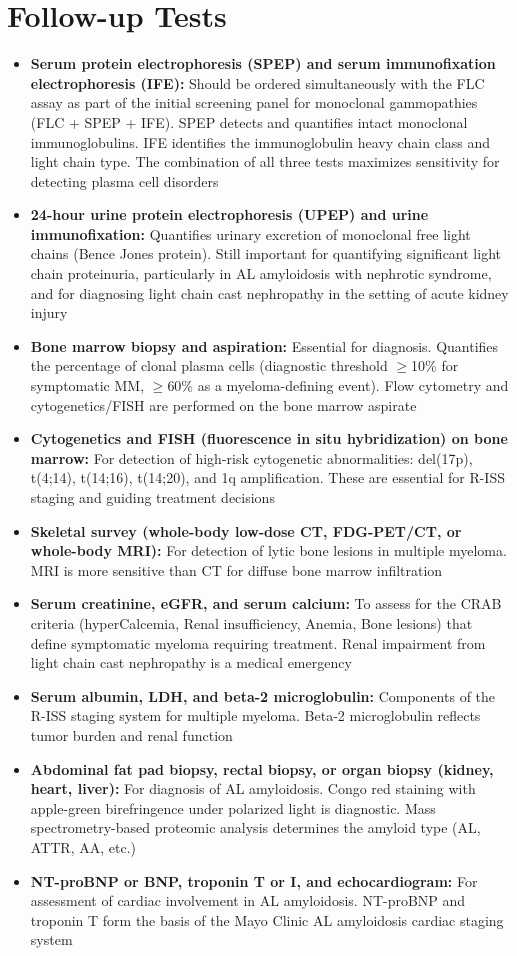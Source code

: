 \section*{Follow-up Tests}
\begin{itemize}
  \item \textbf{Serum protein electrophoresis (SPEP) and serum immunofixation electrophoresis (IFE):} Should be ordered simultaneously with the FLC assay as part of the initial screening panel for monoclonal gammopathies (FLC + SPEP + IFE). SPEP detects and quantifies intact monoclonal immunoglobulins. IFE identifies the immunoglobulin heavy chain class and light chain type. The combination of all three tests maximizes sensitivity for detecting plasma cell disorders
  \item \textbf{24-hour urine protein electrophoresis (UPEP) and urine immunofixation:} Quantifies urinary excretion of monoclonal free light chains (Bence Jones protein). Still important for quantifying significant light chain proteinuria, particularly in AL amyloidosis with nephrotic syndrome, and for diagnosing light chain cast nephropathy in the setting of acute kidney injury
  \item \textbf{Bone marrow biopsy and aspiration:} Essential for diagnosis. Quantifies the percentage of clonal plasma cells (diagnostic threshold $\geq$10\% for symptomatic MM, $\geq$60\% as a myeloma-defining event). Flow cytometry and cytogenetics/FISH are performed on the bone marrow aspirate
  \item \textbf{Cytogenetics and FISH (fluorescence in situ hybridization) on bone marrow:} For detection of high-risk cytogenetic abnormalities: del(17p), t(4;14), t(14;16), t(14;20), and 1q amplification. These are essential for R-ISS staging and guiding treatment decisions
  \item \textbf{Skeletal survey (whole-body low-dose CT, FDG-PET/CT, or whole-body MRI):} For detection of lytic bone lesions in multiple myeloma. MRI is more sensitive than CT for diffuse bone marrow infiltration
  \item \textbf{Serum creatinine, eGFR, and serum calcium:} To assess for the CRAB criteria (hyperCalcemia, Renal insufficiency, Anemia, Bone lesions) that define symptomatic myeloma requiring treatment. Renal impairment from light chain cast nephropathy is a medical emergency
  \item \textbf{Serum albumin, LDH, and beta-2 microglobulin:} Components of the R-ISS staging system for multiple myeloma. Beta-2 microglobulin reflects tumor burden and renal function
  \item \textbf{Abdominal fat pad biopsy, rectal biopsy, or organ biopsy (kidney, heart, liver):} For diagnosis of AL amyloidosis. Congo red staining with apple-green birefringence under polarized light is diagnostic. Mass spectrometry-based proteomic analysis determines the amyloid type (AL, ATTR, AA, etc.)
  \item \textbf{NT-proBNP or BNP, troponin T or I, and echocardiogram:} For assessment of cardiac involvement in AL amyloidosis. NT-proBNP and troponin T form the basis of the Mayo Clinic AL amyloidosis cardiac staging system
\end{itemize}

